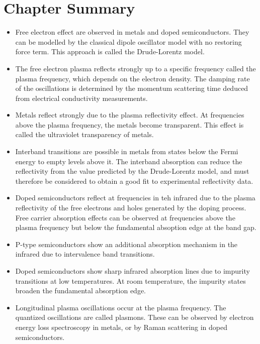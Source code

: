 \documentclass[12pt]{book}
\begin{document}
\section*{Chapter Summary}
\begin{shaded}
\begin{itemize}
  \item Free electron effect are observed in metals and doped semiconductors. They can be modelled by the classical dipole oscillator model with no restoring force term. This approach is called the Drude-Lorentz model.
  \item The free electron plasma reflects strongly up to a specific frequency called the plasma frequency, which depends on the electron density. The damping rate of the oscillations is determined by the momentum scattering time deduced from electrical conductivity measurements.
  \item Metals reflect strongly due to the plasma  reflectivity effect. At frequencies above the plasma frequency, the metals become transparent. This effect is called the ultraviolet transparency of metals.
  \item Interband transitions are possible in metals from states below the Fermi energy to empty levels above it. The interband absorption can reduce the reflectivity from the value predicted by the Drude-Lorentz model, and must therefore be considered to obtain a good fit to experimental reflectivity data.
  \item Doped semiconductors reflect at frequencies in teh infrared due to the plasma reflectivity of the free electrons and holes generated by the doping process. Free carrier absorption effects can be observed at frequencies above the plasma frequency but below the fundamental absoption edge at the band gap.
  \item P-type semiconductors show an additional absorption mechanism in the infrared due to intervalence band transitions.
  \item Doped semiconductors show sharp infrared absorption lines due to impurity transitions at low temperatures. At room temperature, the impurity states broaden the fundamental absorption edge.
  \item Longitudinal plasma oscillations occur at the plasma frequency. The quantized oscillations  are called plasmons. These can be observed by electron energy loss spectroscopy in metals, or by Raman scattering in doped semiconductors.
\end{itemize}
\end{shaded}
\end{document}
